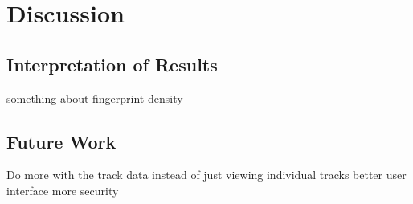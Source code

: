 \chapter{Discussion}
\label{discussion}
%

\section{Interpretation of Results}
%

something about fingerprint density

\section{Future Work}
%

Do more with the track data instead of just viewing individual tracks
better user interface
more security